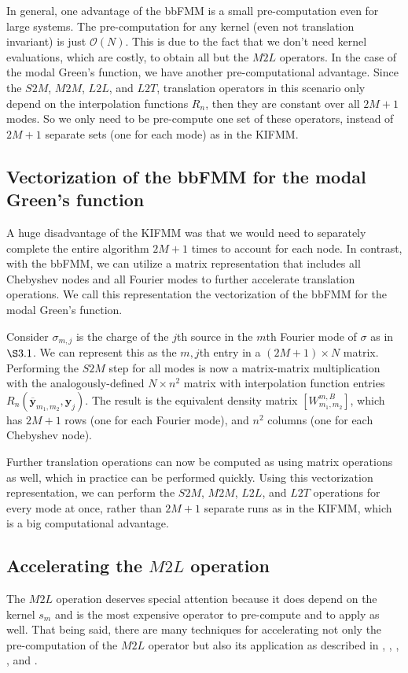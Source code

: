 \documentclass[11pt, oneside]{article}   	%
\begin{document}
In general, one advantage of the bbFMM is a small pre-computation even for large systems. The pre-computation for any kernel (even not translation invariant) is just $\mathcal{O}(N)$. This is due to the fact that we don't need kernel evaluations, which are costly, to obtain all but the $M2L$ operators. In the case of the modal Green's function, we have another pre-computational advantage. Since the $S2M$, $M2M$, $L2L$, and $L2T$, translation operators in this scenario only depend on the interpolation functions $R_n$, then they are constant over all $2M+1$ modes. So we only need to be pre-compute one set of these operators, instead of $2M+1$ separate sets (one for each mode) as in the KIFMM.

\subsection{Vectorization of the bbFMM for the modal Green's function}
A huge disadvantage of the KIFMM was that we would need to separately complete the entire algorithm $2M+1$ times to account for each node. In contrast, with the bbFMM, we can utilize a matrix representation that includes all Chebyshev nodes and all Fourier modes to further accelerate translation operations. We call this representation the vectorization of the bbFMM for the modal Green's function.

Consider $\sigma_{m,j}$ is the charge of  the $j$th source in the $m$th Fourier mode of $\sigma$ as in $\S3.1$. We can represent this as the $m,j$th entry in a $(2M+1)\times N$ matrix. Performing the $S2M$ step for all modes is now a matrix-matrix multiplication with the analogously-defined $N\times n^2$ matrix with interpolation function entries $R_n(\mathbf{\overline{y}}_{m_1,m_2},\mathbf{y}_j)$. The result is the equivalent density matrix $[W^{m,B}_{m_1,m_2}]$, which has $2M+1$ rows (one for each Fourier mode), and $n^2$ columns (one for each Chebyshev node).

Further translation operations can now be computed as using matrix operations as well, which in practice can be performed quickly. Using this vectorization representation, we can perform the $S2M$, $M2M$, $L2L$, and $L2T$ operations for every mode at once, rather than $2M+1$ separate runs as in the KIFMM, which is a big computational advantage.

\subsection{Accelerating the $M2L$ operation}
The $M2L$ operation deserves special attention because it does depend on the kernel $s_m$ and is the most expensive operator to pre-compute and to apply as well. That being said, there are many techniques for accelerating not only the pre-computation of the $M2L$ operator but also its application as described in \cite{A}, \cite{CGMR}, \cite{FD}, \cite{MR}, and \cite{VBT}.
\end{document}
